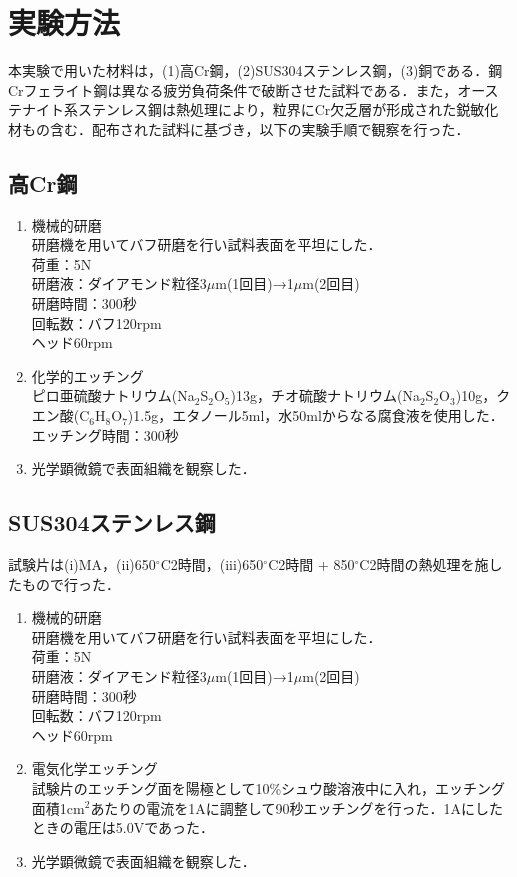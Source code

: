 \section{実験方法}
本実験で用いた材料は，(1)高Cr鋼，(2)SUS304ステンレス鋼，(3)銅である．鋼Crフェライト鋼は異なる疲労負荷条件で破断させた試料である．また，オーステナイト系ステンレス鋼は熱処理により，粒界にCr欠乏層が形成された鋭敏化材もの含む．配布された試料に基づき，以下の実験手順で観察を行った．

\subsection{高Cr鋼}
\begin{enumerate}
    \item 機械的研磨\\
          研磨機を用いてバフ研磨を行い試料表面を平坦にした．\\
          荷重：5N\\
          研磨液：ダイアモンド粒径3$\mu$m(1回目)→1$\mu$m(2回目)\\
          研磨時間：300秒\\
          回転数：バフ120rpm\\
                 ヘッド60rpm
    \item 化学的エッチング\\
          ピロ亜硫酸ナトリウム(Na$_2$S$_2$O$_5$)13g，チオ硫酸ナトリウム(Na$_2$S$_2$O$_3$)10g，クエン酸(C$_6$H$_8$O$_7$)1.5g，エタノール5ml，水50mlからなる腐食液を使用した．\\
          エッチング時間：300秒
      \item 光学顕微鏡で表面組織を観察した．
\end{enumerate}

\subsection{SUS304ステンレス鋼}
試験片は(i)MA，(ii)650$^\circ$C2時間，(iii)650$^\circ$C2時間 + 850$^\circ$C2時間の熱処理を施したもので行った．
\begin{enumerate}
      \item 機械的研磨\\
            研磨機を用いてバフ研磨を行い試料表面を平坦にした．\\
            荷重：5N\\
            研磨液：ダイアモンド粒径3$\mu$m(1回目)→1$\mu$m(2回目)\\
            研磨時間：300秒\\
            回転数：バフ120rpm\\
                   ヘッド60rpm
      \item 電気化学エッチング\\
            試験片のエッチング面を陽極として10\%シュウ酸溶液中に入れ，エッチング面積1cm$^2$あたりの電流を1Aに調整して90秒エッチングを行った．1Aにしたときの電圧は5.0Vであった．
      \item 光学顕微鏡で表面組織を観察した．
\end{enumerate}

